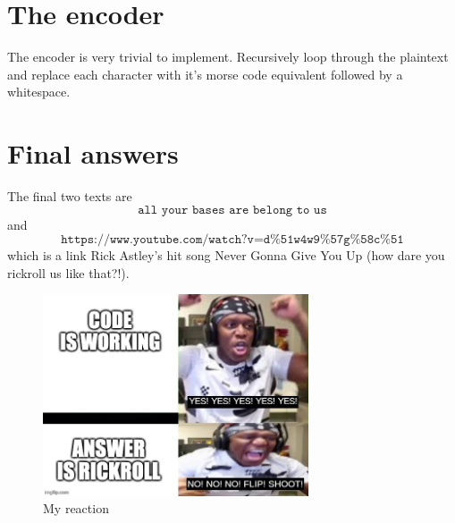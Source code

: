 \section{The encoder}
The encoder is very trivial to implement. Recursively loop through the plaintext and replace each character with it's morse code equivalent followed by a whitespace. 

\section{Final answers}
The final two texts are
\begin{equation*}
    \texttt{all your bases are belong to us}
\end{equation*}
and
\begin{equation*}
    \texttt{https://www.youtube.com/watch?v=d\%51w4w9\%57g\%58c\%51}
\end{equation*}
which is a link Rick Astley's hit song Never Gonna Give You Up (how dare you rickroll us like that?!).
\begin{figure}[h]
    \centering
    \includegraphics[width=0.7\textwidth]{img/meme}
    \caption{My reaction}
\end{figure}

